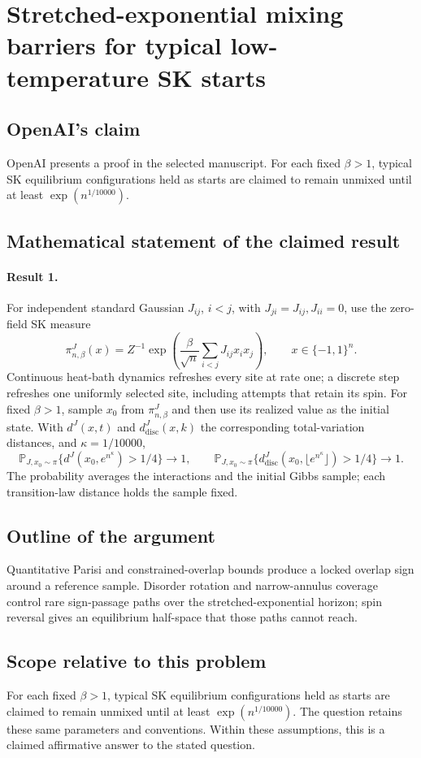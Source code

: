 \documentclass[11pt]{article}
\begin{document}
\section*{Stretched-exponential mixing barriers for typical low-temperature SK starts}

\subsection{OpenAI's claim}
OpenAI presents a proof in the selected manuscript. For each fixed $\beta>1$, typical SK equilibrium configurations held as starts are claimed to remain unmixed until at least $\exp(n^{1/10000})$.

\subsection{Mathematical statement of the claimed result}
\paragraph{Result 1.} For independent standard Gaussian $J_{ij}$, $i<j$, with $J_{ji}=J_{ij},J_{ii}=0$, use the zero-field SK measure
\[
 \pi_{n,\beta}^J(x)=Z^{-1}\exp\left(\frac\beta{\sqrt n}\sum_{i<j}J_{ij}x_ix_j\right),\qquad x\in\{-1,1\}^n.
\]
Continuous heat-bath dynamics refreshes every site at rate one; a discrete step refreshes one uniformly selected site, including attempts that retain its spin. For fixed $\beta>1$, sample $x_0$ from $\pi_{n,\beta}^J$ and then use its realized value as the initial state. With $d^J(x,t)$ and $d_{\mathrm{disc}}^J(x,k)$ the corresponding total-variation distances, and $\kappa=1/10000$,
\[
 \mathbb P_{J,x_0\sim\pi}\{d^J(x_0,e^{n^\kappa})>1/4\}\to1,\qquad
 \mathbb P_{J,x_0\sim\pi}\{d_{\mathrm{disc}}^J(x_0,\lfloor e^{n^\kappa}\rfloor)>1/4\}\to1.
\]
The probability averages the interactions and the initial Gibbs sample; each transition-law distance holds the sample fixed.

\subsection{Outline of the argument}
Quantitative Parisi and constrained-overlap bounds produce a locked overlap sign around a reference sample. Disorder rotation and narrow-annulus coverage control rare sign-passage paths over the stretched-exponential horizon; spin reversal gives an equilibrium half-space that those paths cannot reach.

\subsection{Scope relative to this problem}
For each fixed $\beta>1$, typical SK equilibrium configurations held as starts are claimed to remain unmixed until at least $\exp(n^{1/10000})$. The question retains these same parameters and conventions. Within these assumptions, this is a claimed affirmative answer to the stated question.
\end{document}
